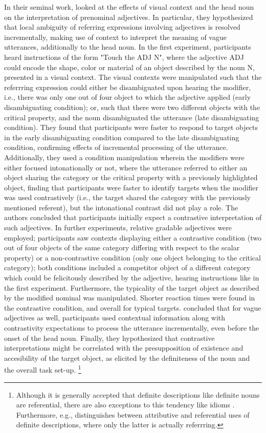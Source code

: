 In their seminal work, \textcite{sedivy1999} looked at the effects of visual context and the head noun on the interpretation of prenominal adjectives. In particular, they hypothesized that local ambiguity of referring expressions involving adjectives is resolved incrementally, making use of context to interpret the meaning of vague utterances, additionally to the head noun. 
In the first experiment, participants heard instructions of the form "Touch the ADJ N", where the adjective ADJ could encode the shape, color or material of an object described by the noun N, presented in a visual context. The visual contexts were manipulated such that the referrring expression could either be disambiguated upon hearing the modifier, i.e., there was only one out of four object to which the adjective applied (early disambiguating condition); or, such that there were two different objects with the critical property, and the noun disambiguated the utterance (late disambiguating condition). 
They found that participants were faster to respond to target objects in the early disambiguating condition compared to the late disambiguating condition, confirming effects of incremental processing of the utterance. 
 Additionally, they used a condition manipulation wherein the modifiers were either focused intonationally or not, where the utterance referred to either an object sharing the category or the critical property with a previously highlighted object, finding that participants were faster to identify targets when the modifier was used contrastively (i.e., the target shared the category with the previously mentioned referent), but the intonational contrast  did not play a role. The authors concluded that participants initially expect a contrastive interpretation of such adjectives. 
 In further experiments, relative gradable adjectives were employed; participants saw contexts displaying either a contrastive condition (two out of four objects of the same category differing with respect to the scalar property) or a non-contrastive condition (only one object belonging to the critical category); both conditions included a competitor object of a different category which could be felicitously described by the adjective, hearing instructions like in the first experiment. Furthermore, the typicality of the target object as described by the modified nominal was manipulated. Shorter reaction times were found in the contrastive condition, and overall for typical targets. \textcite{sedivy1999} concluded that for vague adjectives as well, participants used contextual information along with contrastivity expectations to process the utterance incrementally, even before the onset of the head noun. Finally, they hypothesized that contrastive interpretations might be correlated with the presupposition of existence and accesibility of the target object, as elicited by the definiteness of the noun and the overall task set-up. \footnote{Although it is generally accepted that definite descriptions like definite nouns are referential, there are also exceptions to this tendency like idioms \parencite{Reboul2001}. Furthermore, e.g., \textcite{donnellan1966reference} distinguishes between attributive and referential uses of definite descriptions, where only the latter is actually referrring.} 
